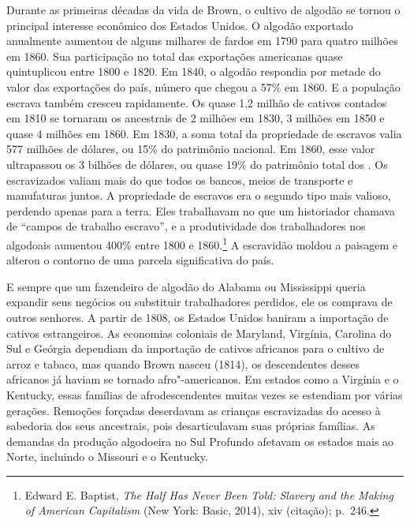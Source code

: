 Durante as primeiras décadas da vida de Brown, o cultivo de algodão se
tornou o principal interesse econômico dos Estados Unidos. O algodão
exportado anualmente aumentou de alguns milhares de fardos em 1790 para
quatro milhões em 1860. Sua participação no total das exportações
americanas quase quintuplicou entre 1800 e 1820. Em 1840, o algodão
respondia por metade do valor das exportações do país, número que chegou
a 57\% em 1860. E a população escrava também cresceu rapidamente. Os
quase 1,2 milhão de cativos contados em 1810 se tornaram os ancestrais
de 2 milhões em 1830, 3 milhões em 1850 e quase 4 milhões em 1860.
Em 1830, a soma total da
propriedade de escravos valia 577 milhões de dólares, ou 15\% do
patrimônio nacional. Em 1860, esse valor ultrapassou os 3 bilhões de
dólares, ou quase 19\% do patrimônio total dos .
Os escravizados valiam mais do que
todos os bancos, meios de transporte e manufaturas juntos. A propriedade
de escravos era o segundo tipo mais valioso, perdendo apenas para a
terra. Eles trabalhavam no que um historiador chamava de ``campos de
trabalho escravo'', e a produtividade dos trabalhadores nos algodoais
aumentou 400\% entre 1800 e 1860.\footnote{Edward E. Baptist, \emph{The
  Half Has Never Been Told: Slavery and the Making of American
  Capitalism} (New York: Basic, 2014), xiv (citação); p.~246.} A escravidão
moldou a paisagem e alterou o contorno de uma parcela significativa do
país.

E sempre que um fazendeiro de algodão do Alabama ou Mississippi queria
expandir seus negócios ou substituir trabalhadores perdidos, ele os
comprava de outros senhores. A partir de 1808, os Estados Unidos baniram
a importação de cativos estrangeiros. As economias coloniais de
Maryland, Virgínia, Carolina do Sul e Geórgia dependiam da importação de
cativos africanos para o cultivo de arroz e tabaco, mas quando Brown
nasceu (1814), os descendentes desses africanos já haviam se tornado
afro"-americanos. Em estados como a Virgínia e o Kentucky, essas famílias
de afrodescendentes muitas vezes se estendiam por várias gerações.
Remoções forçadas deserdavam as crianças escravizadas do acesso à
sabedoria dos seus ancestrais, pois desarticulavam suas próprias
famílias. As demandas da produção algodoeira no Sul Profundo afetavam os
estados mais ao Norte, incluindo o Missouri e o Kentucky.


